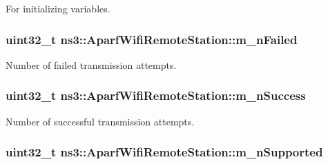 For initializing variables. 

\subsubsection[{\texorpdfstring{m\+\_\+n\+Failed}{m_nFailed}}]{\setlength{\rightskip}{0pt plus 5cm}uint32\+\_\+t ns3\+::\+Aparf\+Wifi\+Remote\+Station\+::m\+\_\+n\+Failed}\hypertarget{structns3_1_1AparfWifiRemoteStation_af40ac5d17a7860c482abed0f1824db99}{}\label{structns3_1_1AparfWifiRemoteStation_af40ac5d17a7860c482abed0f1824db99}


Number of failed transmission attempts. 

\subsubsection[{\texorpdfstring{m\+\_\+n\+Success}{m_nSuccess}}]{\setlength{\rightskip}{0pt plus 5cm}uint32\+\_\+t ns3\+::\+Aparf\+Wifi\+Remote\+Station\+::m\+\_\+n\+Success}\hypertarget{structns3_1_1AparfWifiRemoteStation_a57ea10ff8cffee4470e883da2e65056c}{}\label{structns3_1_1AparfWifiRemoteStation_a57ea10ff8cffee4470e883da2e65056c}


Number of successful transmission attempts. 

\subsubsection[{\texorpdfstring{m\+\_\+n\+Supported}{m_nSupported}}]{\setlength{\rightskip}{0pt plus 5cm}uint32\+\_\+t ns3\+::\+Aparf\+Wifi\+Remote\+Station\+::m\+\_\+n\+Supported}\hypertarget{structns3_1_1AparfWifiRemoteStation_ab0a1d4e8537cc9c3b1eb0ac1a6eed67c}{}\label{structns3_1_1AparfWifiRemoteStation_ab0a1d4e8537cc9c3b1eb0ac1a6eed67c}


